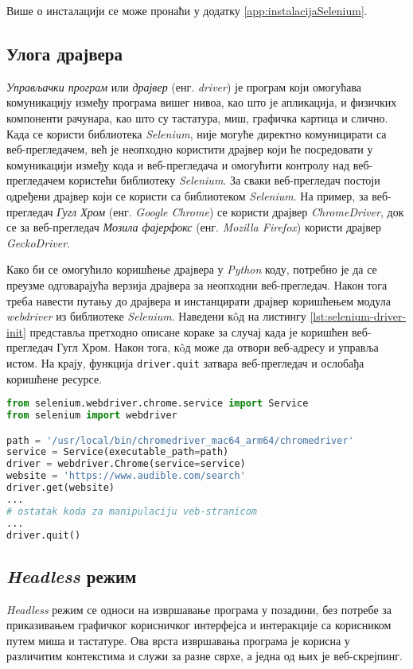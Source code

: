 \documentclass[12pt,oneside]{memoir}
\begin{document}
Више о инсталацији се може пронаћи у додатку \ref{app:instalacijaSelenium}.

\subsection{Улога драјвера}
\emph{Управљачки програм} или \emph{драјвер} (енг. \textit{driver}) је програм који омогућава комуникацију између програма вишег нивоа, као што је апликација, и физичких компоненти рачунара, као што су тастатура, миш, графичка картица и слично. Када се користи библиотека \textit{Selenium}, није могуће директно комуницирати са веб-прегледачем, већ је неопходно користити драјвер који ће посредовати у комуникацији између кода и веб-прегледача и омогућити контролу над веб-прегледачем користећи библиотеку \textit{Selenium}. За сваки веб-прегледач постоји одређени драјвер који се користи са библиотеком \textit{Selenium}. На пример, за веб-прегледач \emph{Гугл Хром} (енг. \textit{Google Chrome}) се користи драјвер \textit{ChromeDriver}, док се за веб-прегледач \emph{Мозила фајерфокс} (енг. \textit{Mozilla Firefox}) користи драјвер \textit{GeckoDriver}.

Како би се омогућило коришћење драјвера у \textit{Python} коду, потребно је да се преузме одговарајућа верзија драјвера за неопходни веб-прегледач. Након тога треба навести путању до драјвера и инстанцирати драјвер коришћењем модула \textit{webdriver} из библиотеке \textit{Selenium}. Наведени кôд на листингу \ref{lst:selenium-driver-init} представља претходно описане кораке за случај када је коришћен веб-прегледач Гугл Хром. Након тога, кôд може да отвори веб-адресу и управља истом. На крају, функција \texttt{driver.quit} затвара веб-прегледач и ослобађа коришћене ресурсе.

\begin{lstlisting}[language=Python, caption={Прикупљање \textit{HTML} кода веб-странице помоћу библиотеке \textit{Selenium}}, label={lst:selenium-driver-init}]
from selenium.webdriver.chrome.service import Service
from selenium import webdriver

path = '/usr/local/bin/chromedriver_mac64_arm64/chromedriver'
service = Service(executable_path=path)
driver = webdriver.Chrome(service=service)
website = 'https://www.audible.com/search'
driver.get(website)
...
# ostatak koda za manipulaciju veb-stranicom
...
driver.quit() 
\end{lstlisting}

\subsection{\textit{Headless} режим}
\textit{Headless} режим се односи на извршавање програма у позадини, без потребе за приказивањем графичког корисничког интерфејса и интеракције са корисником путем миша и тастатуре. Ова врста извршавања програма је корисна у различитим контекстима и служи за разне сврхе, а једна од њих је веб-скрејпинг. 
\end{document}
